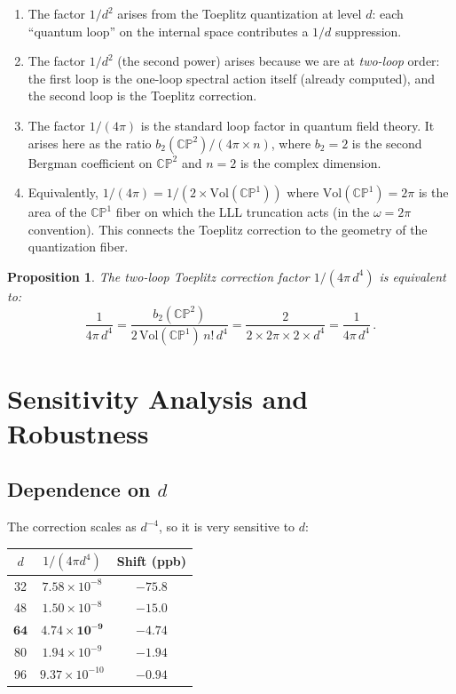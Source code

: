 \documentclass[12pt,a4paper]{article}
\newtheorem{proposition}{Proposition}
\theoremstyle{definition}
\theoremstyle{remark}
\newcommand{\CP}{\mathbb{CP}}
\begin{document}
\begin{enumerate}
\item The factor $1/d^2$ arises from the Toeplitz quantization at level $d$:
  each ``quantum loop'' on the internal space contributes a $1/d$ suppression.

\item The factor $1/d^2$ (the second power) arises because we are at
  \emph{two-loop} order: the first loop is the one-loop spectral action
  itself (already computed), and the second loop is the Toeplitz correction.

\item The factor $1/(4\pi)$ is the standard loop factor in quantum field
  theory. It arises here as the ratio $b_2(\CP^2)/(4\pi \times n)$, where
  $b_2 = 2$ is the second Bergman coefficient on $\CP^2$ and $n = 2$ is
  the complex dimension.

\item Equivalently, $1/(4\pi) = 1/(2 \times \mathrm{Vol}(\CP^1))$ where
  $\mathrm{Vol}(\CP^1) = 2\pi$ is the area of the $\CP^1$ fiber on which
  the LLL truncation acts (in the $\omega = 2\pi$ convention). This
  connects the Toeplitz correction to the geometry of the quantization
  fiber.
\end{enumerate}

\begin{proposition}
The two-loop Toeplitz correction factor $1/(4\pi\,d^4)$ is equivalent to:
\begin{equation}
\frac{1}{4\pi\,d^4} = \frac{b_2(\CP^2)}{2\,\mathrm{Vol}(\CP^1)\,n!\,d^4}
= \frac{2}{2 \times 2\pi \times 2 \times d^4}
= \frac{1}{4\pi\,d^4}\,.
\end{equation}
\end{proposition}

\section{Sensitivity Analysis and Robustness}
\label{sec:sensitivity}

\subsection{Dependence on $d$}

The correction scales as $d^{-4}$, so it is very sensitive to $d$:

\begin{center}
\begin{tabular}{ccc}
\toprule
$d$ & $1/(4\pi d^4)$ & Shift (ppb) \\
\midrule
32 & $7.58 \times 10^{-8}$ & $-75.8$ \\
48 & $1.50 \times 10^{-8}$ & $-15.0$ \\
$\mathbf{64}$ & $\mathbf{4.74 \times 10^{-9}}$ & $\mathbf{-4.74}$ \\
80 & $1.94 \times 10^{-9}$ & $-1.94$ \\
96 & $9.37 \times 10^{-10}$ & $-0.94$ \\
\bottomrule
\end{tabular}
\end{center}
\end{document}
